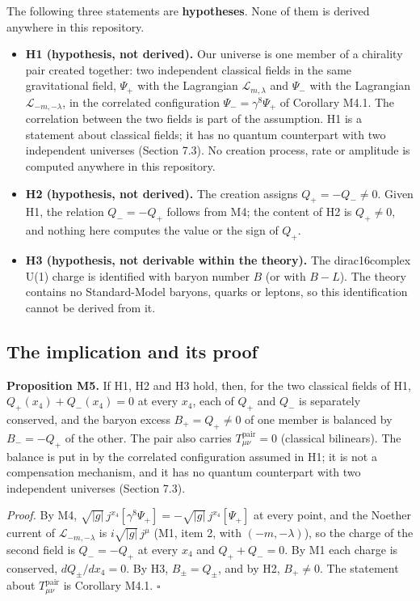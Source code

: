 \documentclass[11pt]{article}
\begin{document}
The following three statements are \textbf{hypotheses}. None of them is derived anywhere in this repository.

\begin{itemize}
\item \textbf{H1 (hypothesis, not derived).} Our universe is one member of a chirality pair created together: two independent classical fields in the same gravitational field, $\Psi_+$ with the Lagrangian $\mathcal L_{m,\lambda}$ and $\Psi_-$ with the Lagrangian $\mathcal L_{-m,-\lambda}$, in the correlated configuration $\Psi_-=\gamma^8\Psi_+$ of Corollary M4.1. The correlation between the two fields is part of the assumption. H1 is a statement about classical fields; it has no quantum counterpart with two independent universes (Section 7.3). No creation process, rate or amplitude is computed anywhere in this repository.
\item \textbf{H2 (hypothesis, not derived).} The creation assigns $Q_+=-Q_-\ne0$. Given H1, the relation $Q_-=-Q_+$ follows from M4; the content of H2 is $Q_+\ne0$, and nothing here computes the value or the sign of $Q_+$.
\item \textbf{H3 (hypothesis, not derivable within the theory).} The dirac16complex U(1) charge is identified with baryon number $B$ (or with $B-L$). The theory contains no Standard-Model baryons, quarks or leptons, so this identification cannot be derived from it.
\end{itemize}

\subsection{The implication and its proof}

\textbf{Proposition M5.} If H1, H2 and H3 hold, then, for the two classical fields of H1, $Q_+(x_4)+Q_-(x_4)=0$ at every $x_4$, each of $Q_+$ and $Q_-$ is separately conserved, and the baryon excess $B_+=Q_+\ne0$ of one member is balanced by $B_-=-Q_+$ of the other. The pair also carries $T^{\mathrm{pair}}_{\mu\nu}=0$ (classical bilinears). The balance is put in by the correlated configuration assumed in H1; it is not a compensation mechanism, and it has no quantum counterpart with two independent universes (Section 7.3).

\emph{Proof.} By M4, $\sqrt{|g|}\,j^{x_4}[\gamma^8\Psi_+]=-\sqrt{|g|}\,j^{x_4}[\Psi_+]$ at every point, and the Noether current of $\mathcal L_{-m,-\lambda}$ is $i\sqrt{|g|}\,j^\mu$ (M1, item 2, with $(-m,-\lambda)$), so the charge of the second field is $Q_-=-Q_+$ at every $x_4$ and $Q_++Q_-=0$. By M1 each charge is conserved, $dQ_\pm/dx_4=0$. By H3, $B_\pm=Q_\pm$, and by H2, $B_+\ne0$. The statement about $T^{\mathrm{pair}}_{\mu\nu}$ is Corollary M4.1. $\square$
\end{document}
